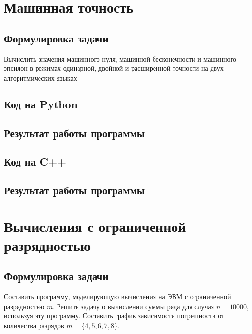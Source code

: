 \documentclass[a4paper,12pt]{article}
\newenvironment{longlisting}{\captionsetup{type=listing}}{}
\begin{document}
\section{Машинная точность}
\subsection{Формулировка задачи}
Вычислить значения машинного нуля, машинной бесконечности и машинного эпсилон в режимах одинарной, двойной и расширенной точности на двух алгоритмических языках.
\subsection{Код на Python}

\begin{longlisting}
\end{longlisting}

\subsection{Результат работы программы}
\begin{longlisting}

\end{longlisting}

\subsection{Код на C++}
\begin{longlisting}
\end{longlisting}

\subsection{Результат работы программы}
\begin{longlisting}

\end{longlisting}


\section{Вычисления с ограниченной разрядностью}
\subsection{Формулировка задачи}
Составить программу, моделирующую вычисления на ЭВМ с ограниченной разрядностью $m$.
Решить задачу о вычислении суммы ряда для случая $n=10000$, используя эту программу. Составить график зависимости погрешности от количества разрядов $m = \{4, 5, 6, 7, 8\}$.
\end{document}
